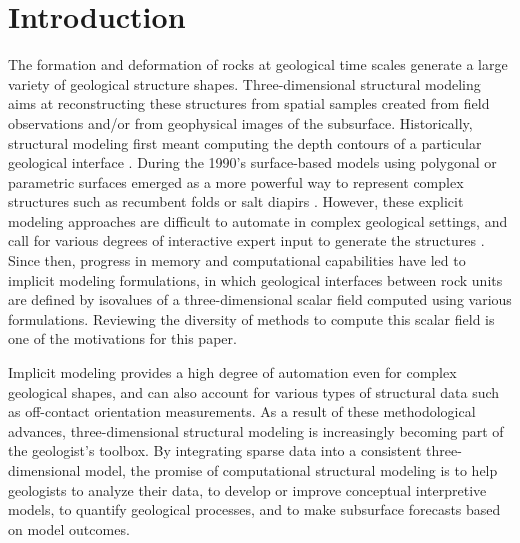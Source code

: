 \documentclass[preprint]{ring20}
\begin{document}
\section*{Introduction}


The formation and deformation of rocks at geological time scales generate a large variety of geological structure shapes. Three-dimensional structural modeling aims at reconstructing these structures from spatial samples created from field observations and/or from geophysical images of the subsurface. Historically, structural modeling first meant computing the depth contours of a particular geological interface \citep[e.g.,][]{Walters1969AB,Hardy1971JGR,Briggs1974G,Bolondi1976G}. During the 1990's surface-based models using polygonal or parametric surfaces emerged as a more powerful way to represent complex structures such as recumbent folds or salt diapirs \citep{Mallet1992CD,deKemp1999CG}. However, these explicit modeling approaches are difficult to automate in complex geological settings, and call for various degrees of interactive expert input to generate the structures \citep{Collon2016I}. Since then, progress in memory and computational capabilities have led to implicit modeling formulations, in which geological interfaces between rock units are defined by isovalues of a three-dimensional scalar field computed using various formulations\citep[][]{Lajaunie1997MG,Cowan2002ASGMEM,Calcagno2008PEPI,Frank2007CG,Caumon2013GaRSITo,Souche20137ECEISE2,Hillier2014MG,Laurent2016MG,Laurent2016EaPSL,Martin2017CG,Grose2017JSG,delaVarga2018GMDD,Grose2019JoSG,Renaudeau2019BEMRMX,Renaudeau2019MG,Manchuk2019CG,Grose2021GMDa,Irakarama2021MG,Hillier2021MG,Goncalves2021C&G,Irakarama2022CD,Pizzella2022MG,Bi2022GMD}. Reviewing the diversity of methods to compute this scalar field is one of the motivations for this paper.  

Implicit modeling provides a high degree of automation even for complex geological shapes, and can also account for various types of structural data such as off-contact orientation  measurements. As a result of these methodological advances, three-dimensional structural modeling is increasingly becoming part of the geologist's toolbox. By integrating sparse data into a consistent three-dimensional model, the promise of computational structural modeling is to help geologists to analyze their data, to develop or improve conceptual interpretive models, to quantify geological processes, and to make subsurface forecasts based on model outcomes. 
\end{document}
